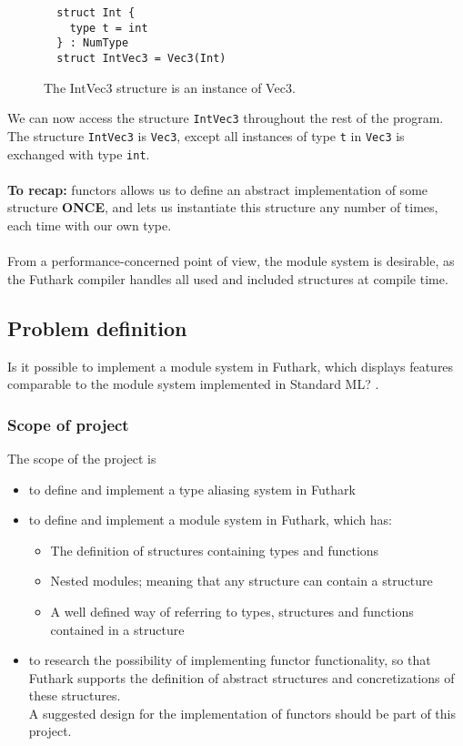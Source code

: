 \begin{figure}
\label{first_functor_example}
\begin{verbatim}
  struct Int {
    type t = int 
  } : NumType
  struct IntVec3 = Vec3(Int)
\end{verbatim}
\caption{The IntVec3 structure is an instance of Vec3.}
\end{figure}
\noindent
We can now access the structure \texttt{IntVec3} throughout the rest of the
program.
\\
The structure \texttt{IntVec3} is \texttt{Vec3}, except all instances
of type \texttt{t} in \texttt{Vec3} is exchanged with type \texttt{int}.
\\
\\
\textbf{To recap:} functors allows us to define an abstract implementation of some
structure \textbf{ONCE}, and lets us instantiate this structure any number of
times, each time with our own type.
\\
\\
From a performance-concerned point of view, the module system is desirable, as the Futhark compiler handles all used and included structures at compile time.
\subsection{Problem definition}
\label{subsec:probdef}
Is it possible to implement a module system in Futhark, which displays features
comparable to the module system implemented in Standard ML? \cite{crash_course}.

\subsubsection{Scope of project}
\label{subsec:project_scope}
The scope of the project is
\begin{itemize}
  \item to define and implement a type aliasing system in Futhark
  \item to define and implement a module system in Futhark, which has:
    \begin{itemize}
      \item The definition of structures containing types and functions
      \item Nested modules; meaning that any structure can contain a structure
      \item A well defined way of referring to types, structures and functions
        contained in a structure
    \end{itemize}
  \item to research the possibility of implementing functor functionality, so that Futhark supports the
    definition of abstract structures and concretizations of these structures.
    \\    A suggested design for the implementation of functors should be part of this project.
\end{itemize}
\clearpage

